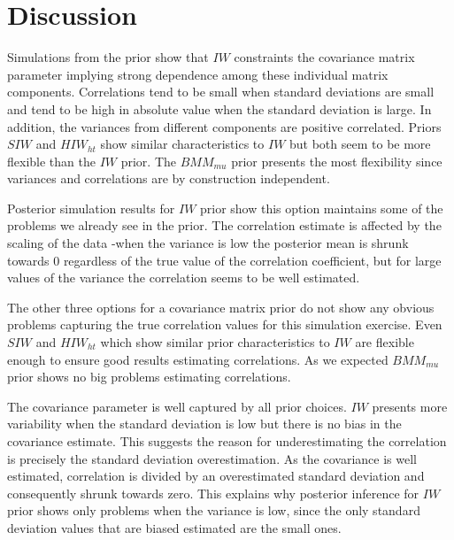 \documentclass[a4paper]{article}
\begin{document}
\section{Discussion} 

Simulations from the prior show that $IW$ constraints the covariance matrix parameter implying strong dependence among these individual matrix components. Correlations tend to be small when standard deviations are small and tend to be high in absolute value when the standard deviation is large. In addition, the variances from different components are positive correlated.  Priors $SIW$ and $HIW_{ht}$ show similar characteristics to $IW$ but both seem to be more flexible than the $IW$ prior. The $BMM_{mu}$ prior presents the most flexibility since variances and correlations are by construction independent.

Posterior simulation results for $IW$ prior show this option maintains some of the problems we already see in the prior.  The correlation estimate is affected by the scaling of the data -when the variance is low the posterior mean is shrunk towards 0 regardless of the true value of the correlation coefficient, but for large values of the variance the correlation seems to be well estimated.  

The other three options for a covariance matrix prior do not show any obvious problems capturing the true correlation values for this simulation exercise. Even  $SIW$ and $HIW_{ht}$ which show similar prior characteristics to $IW$ are flexible enough to ensure good results estimating correlations. As we expected $BMM_{mu}$ prior shows no big problems estimating correlations. 

The covariance parameter is well captured by all prior choices. $IW$ presents more variability when the standard deviation is low but there is no bias in the covariance estimate. This suggests the reason for underestimating the correlation is precisely the standard deviation overestimation. As the covariance is well estimated, correlation is divided by an overestimated standard deviation and consequently shrunk towards zero. This explains why posterior inference for $IW$ prior shows only problems when the variance is low, since the only standard deviation values that are biased estimated are the small ones. 
\end{document}
